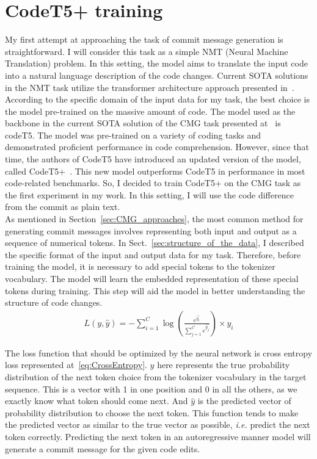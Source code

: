 \section{CodeT5+ training}\label{sec:codeT5_train}
My first attempt at approaching the task of commit message generation is straightforward. I will consider this task as a simple NMT (Neural Machine Translation) problem. In this setting, the model aims to translate the input code into a natural language description of the code changes. Current SOTA solutions in the NMT task utilize the transformer architecture approach presented in~\cite{vaswani2017attention}. According to the specific domain of the input data for my task, the best choice is the model pre-trained on the massive amount of code. The model used as the backbone in the current SOTA solution of the CMG task presented at~{}\cite{eliseeva2023commit} is codeT5. The model was pre-trained on a variety of coding tasks and demonstrated proficient performance in code comprehension. However, since that time, the authors of CodeT5 have introduced an updated version of the model, called CodeT5+~\cite{wang2023codet5+}. This new model outperforms CodeT5 in performance in most code-related benchmarks. So, I decided to train CodeT5+ on the CMG task as the first experiment in my work. In this setting, I will use the code difference from the commit as plain text. \\
As mentioned in Section~\ref{sec:CMG_approaches}, the most common method for generating commit messages involves representing both input and output as a sequence of numerical tokens. In Sect.~\ref{sec:structure_of_the_data}, I described the specific format of the input and output data for my task. Therefore, before training the model, it is necessary to add special tokens to the tokenizer vocabulary. The model will learn the embedded representation of these special tokens during training. This step will aid the model in better understanding the structure of code changes.
\begin{align}
    \label{eq:CrossEntropy}
    L(y, \hat{y}) = -\sum_{i=1}^{C} \log \left( \frac{e^{\hat{y_i}}}{\sum_{j=1}^{C} e^{\hat{y_{j}}}} \right) \times y_i
\end{align}

The loss function that should be optimized by the neural network is cross entropy loss represented at~\ref{eq:CrossEntropy}. $y$ here represents the true probability distribution of the next token choice from the tokenizer vocabulary in the target sequence. This is a vector with 1 in one position and 0 in all the others, as we exactly know what token should come next. And $\hat{y}$ is the predicted vector of probability distribution to choose the next token.  This function tends to make the predicted vector as similar to the true vector as possible, \textit{i.e.} predict the next token correctly. Predicting the next token in an autoregressive manner model will generate a commit message for the given code edits. 

